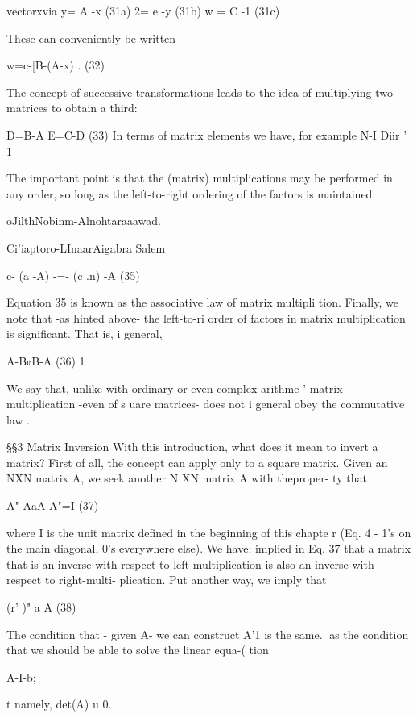 vectorxvia
y= A -x (31a)
2= e -y (31b)
w = C -1 (31c)

These can conveniently be written

w=c-[B-(A-x) . (32)

 

The concept of successive transformations leads to the idea of
multiplying two matrices to obtain a third:

D=B-A E=C-D (33)
In terms of matrix elements we have, for example
N-I
Diir ' 1%

The important point is that the (matrix) multiplications may be
performed in any order, so long as the left-to-right ordering of
the factors is maintained:

oJilthNobinm-Alnohtaraaawad.

Ci'iaptoro-LInaarAigabra Salem

   
  
  
  
  

c- (a -A) -=- (c .n) -A (35)

Equation 35 is known as the associative law of matrix multipli
tion. Finally, we note that -as hinted above- the left-to-ri
order of factors in matrix multiplication is significant. That is, i
general,

A-B¢B-A (36) 1

We say that, unlike with ordinary or even complex arithme '
matrix multiplication -even of s uare matrices- does not i
general obey the commutative law .

\S\S3 Matrix Inversion
With this introduction, what does it mean to invert a matrix? First
of all, the concept can apply only to a square matrix. Given an
NXN matrix A, we seek another N XN matrix A with theproper-
ty that

 

A"-AaA-A"=I (37)

where I is the unit matrix defined in the beginning of this chapte r
(Eq. 4 - 1's on the main diagonal, 0's everywhere else). We have:
implied in Eq. 37 that a matrix that is an inverse with respect to
left-multiplication is also an inverse with respect to right-multi-
plication. Put another way, we imply that

(r' )" a A (38)

The condition that - given A- we can construct A'1 is the same.|
as the condition that we should be able to solve the linear equa-(
tion

A-I-b;

t namely, det(A) u 0.

